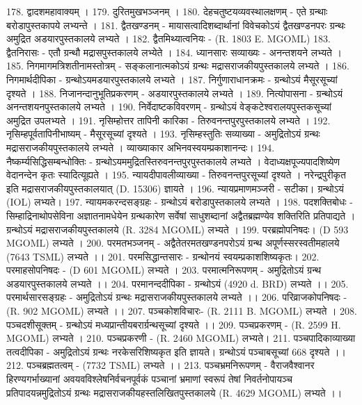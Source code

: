 178. द्वादशमहावाक्यम् । 
179. दुरितमुखभञ्जनम् । 
180. देहचतुष्टयव्यवस्थालक्षणम् - एते ग्रन्थाः बरोडापुस्तकापये लभ्यन्ते । 
181. द्वैतखण्डनम् - मायासत्वादिशब्दार्थानां विवेचकोऽयं द्वैतखण्डनपरः ग्रन्थः अमुद्रित अडयारपुस्तकालये लभ्यते । 
182. द्वैतमिथ्यात्वनियः - (R. 1803 E. MGOML) 
183. द्वैतनिरासः - एतौ ग्रन्थौ मद्रासपुस्तकालये लभ्येते । 
184. ध्यानसारः सव्याख्यः - अनन्तशयने लभ्यते । 
185. निगमागमत्रिशतीनामस्तोत्रम् - सङ्कलानात्मकोऽयं ग्रन्थः मद्रासराजकीयपुस्तकालये लभ्यते । 
186. निगमार्थदीपिका - ग्रन्थोऽयमडयारपुस्तकालये लभ्यते । 
187. निर्गुणाराधानक्रमः - ग्रन्थोऽयं मैसूरसूच्यां दृश्यते ।
188. निजानन्दानुभूतिप्रकरणम् - अडयारपुस्तकालये लभ्यते । 
189. नित्योपासना - ग्रन्थोऽयं अनन्तशयनपुस्तकालये लभ्यते । 
190. निर्वेदाष्टकविवरणम् - ग्रन्थोऽयं वेङ्कटेश्वरालयपुस्तकसूच्यां अमुद्रित उपलभ्यते । 
191. नृसिम्होत्तर तापिनी कारिका - तिरुवनन्तपुरपुस्तकालये लभ्यते ।
192. नृसिम्हपूर्वतापिनीभाष्यम् - मैसूरसूच्यां दृश्यते । 
193. नृसिम्हस्तुतिः सव्याख्या - अमुद्रितोऽयं ग्रन्थः मद्रासराजकीयपुस्तकालये लभ्यते । व्याख्याकार अभिनवस्वयम्प्रकाशानन्दः। 
194. नैष्कर्म्यसिद्धिसम्बन्धोक्तिः - ग्रन्थोऽयममुद्रितस्तिरुवनन्तपुरपुस्तकालये लभ्यते । वेदाध्यक्षपूज्यपादशिष्येण वेदानन्देन कृतः स्यादित्यूह्यते । 
195. न्यायदीपावलीव्याख्या - तिरुवनन्तपुरसूच्यां दृश्यते । नरेन्द्रपुरीकृत इति मद्रासराजकीयपुस्तकालयात् (D. 15306) ज्ञायते । 
196. न्यायप्रमाणमञ्जरी - सटीका। ग्रन्थोऽयं (IOL) लभ्यते। 
197. न्यायमकरन्दसङ्ग्रहः - ग्रन्थोऽयं बरोडापुस्तकालये लभ्यते । 
198. पदशक्तिबोधः - सिम्हाद्रिनाथोपसेविना अज्ञातनामधेयेन ग्रन्थकारेण सर्वेषां साधुशब्दानां अद्वैतब्रह्मण्येव शक्तिरिति प्रतिपाद्यते । ग्रन्थोऽयं मद्रासराजकीयपुस्तकालये (R. 3284 MGOML) लभ्यते । 
199. परब्रह्मोपनिषदः। (D 593 MGOML) लभ्यते । 
200. परमतभञ्जनम् - अद्वैतेतरमतखण्डनपरोऽयं ग्रन्थ अपूर्णस्सरस्वतीमहालये (7643 TSML) लभ्यते ।। 
201. परमसिद्धान्तसारः - ग्रन्थोनयं स्वयम्प्रकाशशिष्यकृतः। 
202. परमाहसोपनिषदः - (D 601 MGOML) लभ्यते । 
203. परमात्मनिरूपणम् - अमुद्रितोऽयं ग्रन्थ अडयारपुस्तकालये लभ्यते ।। 
204. परमानन्ददीपिका - ग्रन्थोऽयं (4920 d. BRD) लभ्यते ।।
205. परमार्थसारसङ्ग्रहः - अमुद्रितोऽयं ग्रन्थः मद्रासराजकीयपुस्तकालये लभ्यते ।। 
206. परिव्राजकोपनिषदः - (R. 902 MGOML) लभ्यते ।।
207. पञ्चकोशविचारः- (R. 2111 B. MGOML) लभ्यते ।
208. पञ्चदशीसूक्तम् - ग्रन्थोऽयं मध्यप्रान्तीयबरार्ग्रन्थसूच्यां दृश्यते ।।
209. पञ्चप्रकरणम् - (R. 2599 H. MGOML) लभ्यते ।
210. पञ्चप्रकरणी - (R. 2460 MGOML) लभ्यते।
211. पञ्चपादिकाव्याख्या तत्वदीपिका - अमुद्रितोऽयं ग्रन्थः नरकेसरिशिष्यकृत इति ज्ञायते। ग्रन्थोऽयं पञ्चाबसूच्यां 668 दृश्यते ।।
212. पञ्चब्रह्मतत्वम् - (7732 TSML) लभ्यते ।। 
213. पञ्चभ्रमनिरूपणम् - वैराजवैश्वानर हिरण्यगर्भाख्यानां अवयवविश्लेषनिर्वचनपूर्वकं पञ्चानां भ्रमाणां स्वरूपं तेषां निवर्तनोपायञ्च प्रतिपादयन्नमुद्रितोऽयं ग्रन्थः मद्रासराजकीयहस्तलिखितपुस्तकालये (R. 4629 MGOML) लभ्यते ।। 
